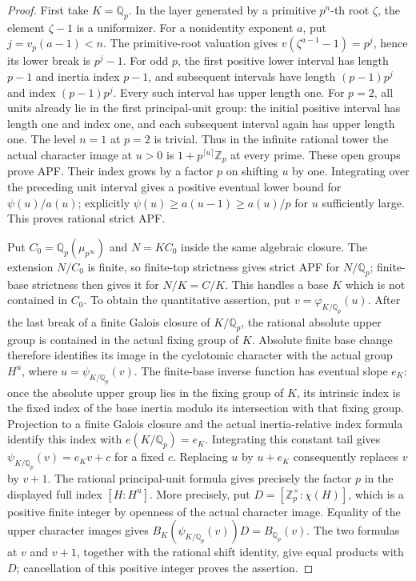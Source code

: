 \begin{proof}
First take $K=\mathbb Q_p$. In the layer generated by a primitive
$p^n$-th root $\zeta$, the element $\zeta-1$ is a uniformizer.
For a nonidentity exponent $a$, put $j=v_p(a-1)<n$.
The primitive-root valuation gives
$v(\zeta^{a-1}-1)=p^j$, hence its lower break is $p^j-1$.
For odd $p$, the first positive lower interval has length $p-1$
and inertia index $p-1$, and subsequent intervals have length
$(p-1)p^j$ and index $(p-1)p^j$. Every such interval has upper
length one. For $p=2$, all units already lie in the first
principal-unit group: the initial positive interval has length
one and index one, and each subsequent interval again has upper
length one. The level $n=1$ at $p=2$ is trivial. Thus in the
infinite rational tower the actual character image at $u>0$ is
$1+p^{\lceil u\rceil}\mathbb Z_p$ at every prime. These open
groups prove APF. Their index grows by a factor $p$ on shifting
$u$ by one. Integrating over the preceding unit interval gives
a positive eventual lower bound for $\psi(u)/a(u)$; explicitly
$\psi(u)\geq a(u-1)\geq a(u)/p$ for $u$ sufficiently large.
This proves rational strict APF.

Put $C_0=\mathbb Q_p(\mu_{p^\infty})$ and $N=KC_0$ inside the
same algebraic closure. The extension $N/C_0$ is finite, so finite-top
strictness gives strict APF for $N/\mathbb Q_p$; finite-base
strictness then gives it for $N/K=C/K$. This handles a base $K$
which is not contained in $C_0$. To obtain the
quantitative assertion, put $v=\varphi_{K/\mathbb Q_p}(u)$.
After the last break of a finite Galois closure of $K/\mathbb Q_p$,
the rational absolute upper group is contained in the actual fixing
group of $K$. Absolute finite base change therefore identifies its
image in the cyclotomic character with the actual group $H^u$,
where $u=\psi_{K/\mathbb Q_p}(v)$. The finite-base inverse function
has eventual slope $e_K$: once the absolute upper group lies in
the fixing group of $K$, its intrinsic index is the fixed index
of the base inertia modulo its intersection with that fixing
group. Projection to a finite Galois closure and the actual
inertia-relative index formula identify this index with
$e(K/\mathbb Q_p)=e_K$. Integrating this constant tail gives
$\psi_{K/\mathbb Q_p}(v)=e_Kv+c$ for a fixed $c$. Replacing $u$
by $u+e_K$ consequently replaces $v$ by $v+1$. The rational
principal-unit formula gives precisely the factor $p$ in the
displayed full index $[H:H^u]$. More precisely, put
$D=[\mathbb Z_p^\times:\chi(H)]$, which is a positive finite
integer by openness of the actual character image. Equality of the
upper character images gives
$B_K(\psi_{K/\mathbb Q_p}(v))D=B_{\mathbb Q_p}(v)$.
The two formulas at $v$ and $v+1$, together with the rational
shift identity, give equal products with $D$; cancellation of
this positive integer proves the assertion.
\end{proof}

